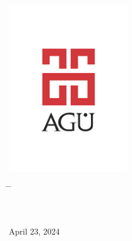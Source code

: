 \begin{center}
	\includegraphics[width=0.4\textwidth]{assets/agu.png}

	\Huge
	\textbf{\paperTitle}

	\vspace{0.3cm}
	\Huge
	\paperSubTitle{}

	\vspace{0.8cm}
	\large
	\vspace{0.5cm}
	\LARGE
	\vspace{1.5cm}
	\textbf{}
	\vfill
	\vspace{0.8cm}
	\Large
\end{center}

\begin{tabbing}
	\hspace*{1em}\= \hspace*{8em} \= \kill
	\> \author{} \> \sid{} \\
	\> \> \\
	\> April 23, 2024 \> \\
\end{tabbing}
